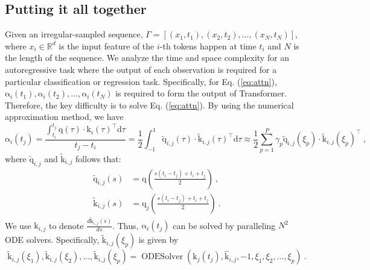 \subsection{Putting it all together}

Given an irregular-sampled sequence, $\Gamma=[ (x_1, t_1), (x_2, t_2), ..., (x_N, t_N)]$, where $x_i \in \mathbb{R}^{d}$ is the input feature of the $i$-th tokens happen at time $t_i$ and $N$ is the length of the sequence. We analyze the time and space complexity for an autoregressive task where the output of each observation is required for a particular classification or regression task. Specifically, for Eq. (\ref{eq:attn}), $\boldsymbol{\mathrm{\alpha}}_i(t_1), \boldsymbol{\mathrm{\alpha}}_i(t_2), \ldots, \boldsymbol{\mathrm{\alpha}}_i(t_N)$ is required to form the output of Transformer. Therefore, the key difficulty is to solve Eq. (\ref{eq:attn}). By using the numerical approximation method, we have
\begin{equation}
    \boldsymbol{\mathrm{\alpha}}_i(t_j) = \frac{\int_{t_i}^{t_j} \boldsymbol{\mathrm{q}}(\tau) \cdot \boldsymbol{\mathrm{k}}_i(\tau)^\top \text{d}\tau}{t_j - t_i} = \frac{1}{2} \int_{-1}^{1} \tilde{\boldsymbol{\mathrm{q}}}_{i,j}(\tau) \cdot \tilde{\boldsymbol{\mathrm{k}}}_{i,j}(\tau)^\top \text{d} \tau \approx  \frac{1}{2} \sum_{p=1}^{P} \gamma_p \tilde{\boldsymbol{\mathrm{q}}}_{i,j}(\xi_p) \cdot \tilde{\boldsymbol{\mathrm{k}}}_{i,j}(\xi_p)^{\top} ~,
\end{equation}
where $\tilde{\boldsymbol{\mathrm{q}}}_{i,j}$ and $\tilde{\boldsymbol{\mathrm{k}}}_{i,j}$ follows that:
\begin{equation}
\begin{aligned}
  \tilde{\boldsymbol{\mathrm{q}}}_{i,j}(s) & = \boldsymbol{\mathrm{q}}\left(\frac{s(t_i - t_j) + t_i + t_j}{2}\right) ~,  \\
  \tilde{\boldsymbol{\mathrm{k}}}_{i,j}(s) & = \boldsymbol{\mathrm{q}}_j\left(\frac{s(t_i - t_j) + t_i + t_j}{2}\right) ~.
\end{aligned}
\end{equation}
We use $\hat{\boldsymbol{\mathrm{k}}}_{i,j}$ to denote $\frac{d \tilde{\boldsymbol{\mathrm{k}}}_{i,j}(s)}{d s}$. Thus, $\boldsymbol{\mathrm{\alpha}}_i(t_j)$ can be solved by paralleling $N^2$ ODE solvers. Specifically, $\tilde{\boldsymbol{\mathrm{k}}}_{i,j}(\xi_p)$ is given by
\begin{equation}
    \tilde{\boldsymbol{\mathrm{k}}}_{i,j}(\xi_1), \tilde{\boldsymbol{\mathrm{k}}}_{i,j}(\xi_2), ..., \tilde{\boldsymbol{\mathrm{k}}}_{i,j}(\xi_p) = \operatorname{ODESolver} (\boldsymbol{\mathrm{k}}_j(t_j), \hat{\boldsymbol{\mathrm{k}}}_{i,j}, -1, \xi_1, \xi_2, ..., \xi_p) ~.
\end{equation}

